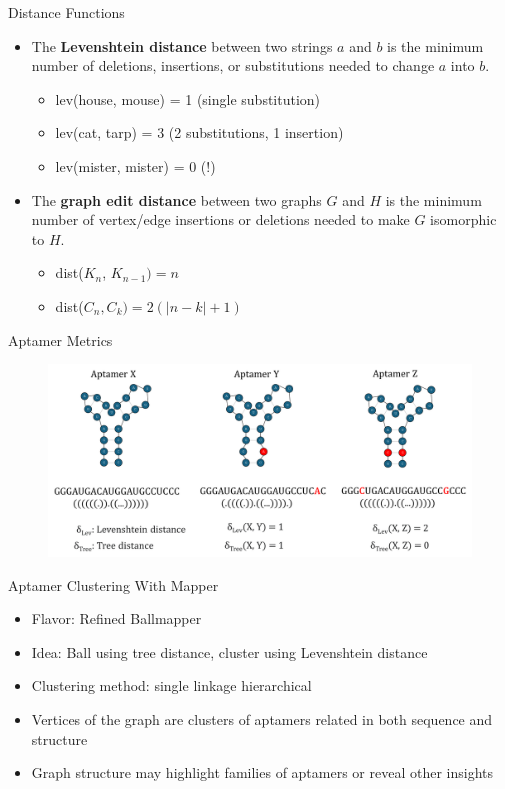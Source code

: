\documentclass{beamer}
\begin{document}
\begin{frame}{Distance Functions}
  \begin{itemize}
    \item The \textbf{Levenshtein distance} between two strings $a$ and $b$ is the minimum number of deletions, insertions, or substitutions needed to change $a$ into $b$.
    \begin{itemize}
      \item lev(house, mouse) = 1 (single substitution)
      \item lev(cat, tarp) = 3 (2 substitutions, 1 insertion)
      \item lev(mister, mister) = 0 (!)
    \end{itemize}
    \item The \textbf{graph edit distance} between two graphs $G$ and $H$ is the minimum number of vertex/edge insertions or deletions needed to make $G$ isomorphic to $H$.
    \begin{itemize}
      \item dist($K_n$, $K_{n-1}) = n$
      \item dist($C_n, C_k) = 2(|n-k|+1)$
    \end{itemize}
  \end{itemize}
\end{frame}

\begin{frame}{Aptamer Metrics}
  \begin{figure}
    \begin{center}
      \hspace*{-.75cm}\includegraphics[width=1.1\textwidth]{aptamers.png}\cite{billapts}
    \end{center}
  \end{figure}
\end{frame}

\begin{frame}{Aptamer Clustering With Mapper}
  \begin{itemize}
    \item Flavor: Refined Ballmapper
    \item Idea: Ball using tree distance, cluster using Levenshtein distance
    \item Clustering method: single linkage hierarchical
    \item Vertices of the graph are clusters of aptamers related in both sequence and structure
    \item Graph structure may highlight families of aptamers or reveal other insights
  \end{itemize}
\end{frame}
\end{document}
